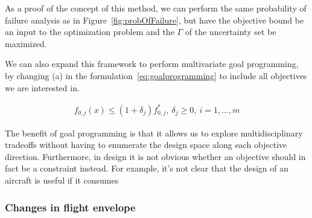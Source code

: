 As a proof of the concept of this method, we can perform the same probability of failure
analysis as in Figure~\ref{fig:probOfFailure}, but have the objective bound be an input to the
optimization problem and the $\Gamma$ of the uncertainty set be maximized.

We can also expand this framework to perform multivariate goal programming,
by changing (a) in the formulation~\ref{eq:goalprogramming} to include all
objectives we are interested in.

\begin{align*}
    f_{0,j}(x) \leq (1+\delta_j) f^*_{0,j},~\delta_j \geq 0,~i = 1,\ldots, m
    \label{eq:multigoal}
\end{align*}

The benefit of goal programming is that it allows us to explore multidisciplinary tradeoffs without
having to enumerate the design space along each objective direction. Furthermore, in design it is not obvious whether
an objective should in fact be a constraint instead. For example, it's not clear that the design
of an aircraft is useful if it consumes

\subsubsection{Changes in flight envelope}
